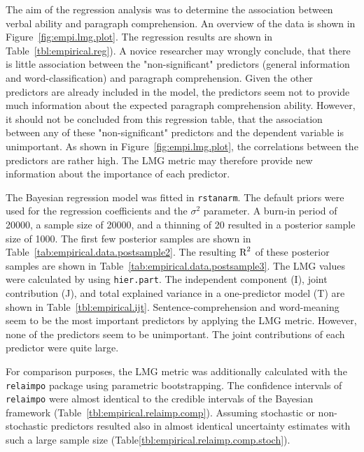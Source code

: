 \documentclass[11pt,a4paper,twoside]{book}
\begin{document}
The aim of the regression analysis was to determine the  association between verbal ability and paragraph comprehension.  
An overview of the data is shown in Figure~\ref{fig:empi.lmg.plot}. The regression results are shown in Table~\ref{tbl:empirical.reg}). A novice researcher may wrongly conclude, that there is little association between the "non-significant" predictors (general information and word-classification) and paragraph comprehension. Given the other predictors are already included in the model, the predictors seem not to provide  much information about the expected paragraph comprehension ability. However, it should not be concluded from this regression table, that the association between any of these "non-significant" predictors and the dependent variable is unimportant. As shown in Figure~\ref{fig:empi.lmg.plot}, the correlations between the predictors are rather high. The LMG metric may therefore provide new information about the importance of each predictor. 

The Bayesian regression model was fitted in \texttt{rstanarm}. The default priors were used for the regression coefficients and the $\sigma^2$ parameter. A burn-in period of 20000, a sample size of 20000, and a thinning of 20 resulted in a posterior sample size of 1000. The first few posterior samples are shown in Table~\ref{tab:empirical.data.postsample2}. The resulting $\text{R}^2$ of these posterior samples are shown in Table~\ref{tab:empirical.data.postsample3}. The LMG values were calculated by using \texttt{hier.part}. The  independent component (I), joint contribution (J), and total explained variance in a one-predictor model (T) are shown in Table~\ref{tbl:empirical.ijt}. Sentence-comprehension and word-meaning seem to be the most important predictors by applying the LMG metric. However, none of the predictors seem to be unimportant.  The joint contributions of each predictor were quite large.

For comparison purposes, the LMG metric was additionally calculated with the \texttt{relaimpo} package using parametric bootstrapping. The confidence intervals of  \texttt{relaimpo} were almost identical to the credible intervals of the Bayesian framework (Table~\ref{tbl:empirical.relaimp.comp}). Assuming stochastic or non-stochastic predictors resulted also in almost identical uncertainty estimates with such a large sample size (Table\ref{tbl:empirical.relaimp.comp.stoch}). 
\end{document}
